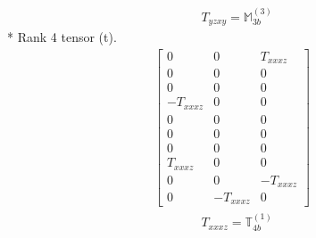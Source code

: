 \documentclass[fleqn,8pt,landscape]{jsarticle}
\begin{document}
\begin{align*}
& T_{yzxy} = \mathbb{M}_{3b}^{(3)}
\end{align*}
* Rank 4 tensor (t).
\begin{align*}
\begin{bmatrix} 0 & 0 & T_{xxxz} \\ 0 & 0 & 0 \\ 0 & 0 & 0 \\ - T_{xxxz} & 0 & 0 \\ 0 & 0 & 0 \\ 0 & 0 & 0 \\ 0 & 0 & 0 \\ T_{xxxz} & 0 & 0 \\ 0 & 0 & - T_{xxxz} \\ 0 & - T_{xxxz} & 0 \end{bmatrix}
\end{align*}
\begin{align*}
& T_{xxxz} = \mathbb{T}_{4b}^{(1)}
\end{align*}
\end{document}
